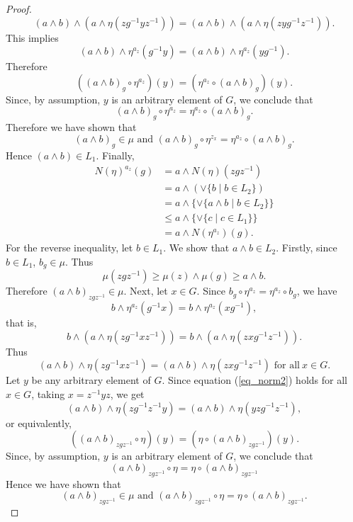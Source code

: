 \documentclass[10pt,a4paper]{amsart}
\begin{document}
\begin{proof}
	\[ (a \wedge b) \wedge (a \wedge \eta(zg^{-1}yz^{-1})) = (a \wedge b) \wedge (a \wedge \eta(zyg^{-1}z^{-1})). \]
	This implies
	\[ (a \wedge b) \wedge \eta^{a_z}(g^{-1}y) = (a \wedge b) \wedge \eta^{a_z}(yg^{-1}). \] 
	Therefore
	\[ ((a \wedge b)_g \circ \eta^{a_z})(y) = (\eta^{a_z} \circ (a \wedge b)_g)(y). \]
	Since, by assumption, $y$ is an arbitrary element of $G$, we conclude that 
	\[ (a \wedge b)_g \circ \eta^{a_z} = \eta^{a_z} \circ (a \wedge b)_g. \]
	Therefore we have shown that 
	\[ (a \wedge b)_g \in \mu \text{ and } (a \wedge b)_g \circ \eta^{z_x} = \eta^{a_z} \circ (a \wedge b)_g. \]
	Hence $(a \wedge b) \in L_1$. Finally,
	\begin{equation*}
	\begin{split}
		N(\eta)^{a_z}(g) &= a \wedge N(\eta)(zgz^{-1}) \\
			&= a \wedge (\vee \{ b \mid b \in L_2 \}) \\
			&= a \wedge \{\vee \{ a \wedge b \mid b \in L_2 \}\} \\
			&\leq a \wedge \{\vee \{ c \mid c \in L_1\}\} \\
			&= a \wedge N(\eta^{a_z})(g).
	\end{split}
	\end{equation*}
	For the reverse inequality, let $b \in L_1$. We show that $a \wedge b \in L_2$. Firstly, since $b \in L_1$, $b_g \in \mu$. Thus
	\[ \mu(zgz^{-1}) \geq \mu(z) \wedge \mu(g) \geq a \wedge b. \]
	Therefore $(a \wedge b)_{zgz^{-1}} \in \mu$. Next, let $x \in G$. Since $b_g \circ \eta^{a_z} = \eta^{a_z} \circ b_g$, we have 
	\[ b \wedge \eta^{a_z}(g^{-1}x) = b \wedge \eta^{a_z}(xg^{-1}), \]
	that is, 
	\[ b \wedge (a \wedge \eta(zg^{-1}xz^{-1})) = b \wedge (a \wedge \eta(zxg^{-1}z^{-1})). \]
	Thus 
	\begin{equation}\label{eq_norm2}
		(a \wedge b) \wedge \eta(zg^{-1}xz^{-1}) = (a \wedge b) \wedge \eta(zxg^{-1}z^{-1}) \text{~for all}~x \in G.
	\end{equation}
	Let $y$ be any arbitrary element of $G$. Since equation (\ref{eq_norm2}) holds for all $x \in G$, taking $x = z^{-1}yz$, we get
	\[ (a \wedge b) \wedge \eta(zg^{-1}z^{-1}y) = (a \wedge b) \wedge \eta(yzg^{-1}z^{-1}), \]
	or equivalently,
	\[((a \wedge b)_{zgz^{-1}} \circ \eta)(y) = (\eta \circ (a \wedge b)_{zgz^{-1}})(y). \]
	Since, by assumption, $y$ is an arbitrary element of $G$, we conclude that 
	\[ (a \wedge b)_{zgz^{-1}} \circ \eta = \eta \circ (a \wedge b)_{zgz^{-1}} \]
	Hence we have shown that 
	\[ (a \wedge b)_{zgz^{-1}} \in \mu \text{ and } (a \wedge b)_{zgz^{-1}} \circ \eta = \eta \circ (a \wedge b)_{zgz^{-1}}. \]

\end{proof}
\end{document}
